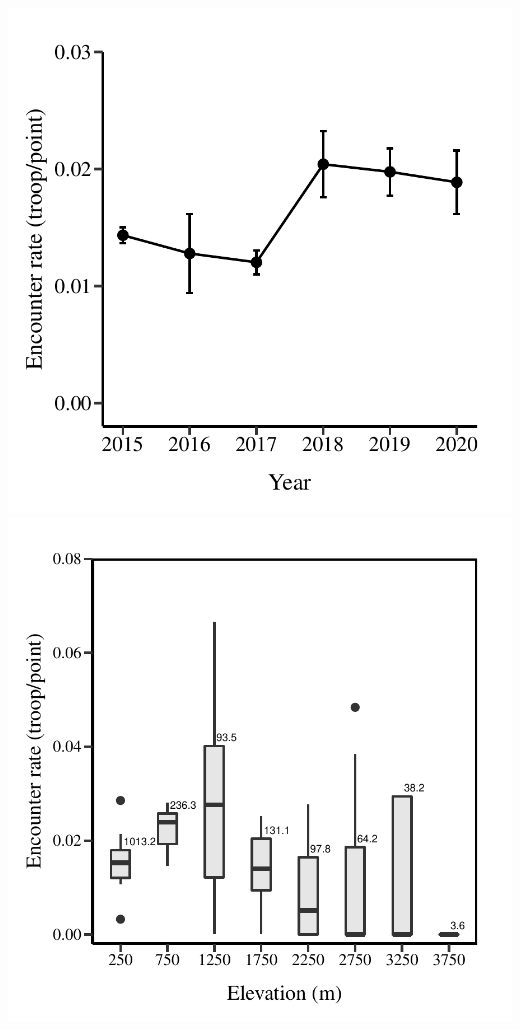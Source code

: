 \documentclass[
]{article}
\begin{document}
\includegraphics{6-data-plot_files/figure-latex/unnamed-chunk-16-1.pdf}
\includegraphics{6-data-plot_files/figure-latex/unnamed-chunk-17-1.pdf}
\end{document}
